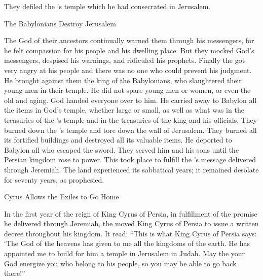 {They defiled
the
{}’s
temple
which
he had consecrated
in Jerusalem.
\par }{\SH The Babylonians Destroy Jerusalem
\par }{\PP {}The
{}
God
of their ancestors
continually warned
them through
his messengers,
for
he felt
compassion
for
his people
and his dwelling place.
But they mocked
God’s
messengers,
despised
his warnings,
and ridiculed
his prophets.
Finally
the {}
got
very angry
at his people
and there was no one
who could prevent his judgment.
He brought
against
them
the king
of the Babylonians,
who slaughtered
their young men
in their temple.
He did not
spare
young men
or women,
or even the old
and aging.
God handed
everyone
over to him.
He carried away to Babylon
all
the items
in God’s
temple,
whether large
or small,
as well as what was in the treasuries
of the
{}’s
temple
and in the treasuries
of the king
and his officials.
They burned down
the
{}’s
temple
and tore
down the wall
of Jerusalem.
They burned
all
its fortified buildings
and destroyed
all
its valuable
items.
He deported
to
Babylon
all who escaped
the sword.
They served
him and his sons
until
the Persian
kingdom rose to power.
This took place to fulfill
the
{}’s
message
delivered
through Jeremiah.
The land
experienced
its sabbatical
years;
it remained
desolate
for seventy
years,
as prophesied.
\par }{\SH Cyrus Allows the Exiles to Go Home
\par }{\PP {}In the first
year
of the reign of King
Cyrus
of Persia,
in fulfillment
of the promise he delivered through
Jeremiah,
the {}
moved
King
Cyrus
of Persia
to issue
a written decree
throughout
his kingdom.
It read: “This is what
King
Cyrus
of Persia
says: ‘The
{}
God
of the heavens
has given
to me all
the kingdoms
of the earth.
He has appointed
me to build
for him a temple
in Jerusalem
in Judah.
May the
{}
your God
energize
you who
belong to his people,
so you may be able to go back there!”
\par }